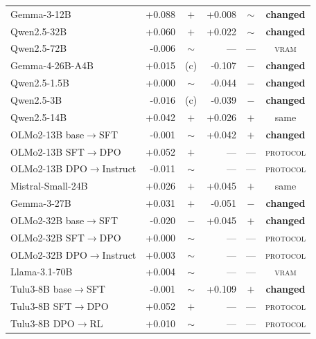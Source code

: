 \begin{table}[t]
\begin{tabular}{lrcrcc}
Gemma-3-12B & +0.088 & $+$ & +0.008 & $\sim$ & \textbf{changed} \\
Qwen2.5-32B & +0.060 & $+$ & +0.022 & $\sim$ & \textbf{changed} \\
Qwen2.5-72B & -0.006 & $\sim$ & --- & --- & \textsc{vram} \\
Gemma-4-26B-A4B & +0.015 & (c) & -0.107 & $-$ & \textbf{changed} \\
Qwen2.5-1.5B & +0.000 & $\sim$ & -0.044 & $-$ & \textbf{changed} \\
Qwen2.5-3B & -0.016 & (c) & -0.039 & $-$ & \textbf{changed} \\
Qwen2.5-14B & +0.042 & $+$ & +0.026 & $+$ & same \\
OLMo2-13B base$\rightarrow$SFT & -0.001 & $\sim$ & +0.042 & $+$ & \textbf{changed} \\
OLMo2-13B SFT$\rightarrow$DPO & +0.052 & $+$ & --- & --- & \textsc{protocol} \\
OLMo2-13B DPO$\rightarrow$Instruct & -0.011 & $\sim$ & --- & --- & \textsc{protocol} \\
Mistral-Small-24B & +0.026 & $+$ & +0.045 & $+$ & same \\
Gemma-3-27B & +0.031 & $+$ & -0.051 & $-$ & \textbf{changed} \\
OLMo2-32B base$\rightarrow$SFT & -0.020 & $-$ & +0.045 & $+$ & \textbf{changed} \\
OLMo2-32B SFT$\rightarrow$DPO & +0.000 & $\sim$ & --- & --- & \textsc{protocol} \\
OLMo2-32B DPO$\rightarrow$Instruct & +0.003 & $\sim$ & --- & --- & \textsc{protocol} \\
Llama-3.1-70B & +0.004 & $\sim$ & --- & --- & \textsc{vram} \\
Tulu3-8B base$\rightarrow$SFT & -0.001 & $\sim$ & +0.109 & $+$ & \textbf{changed} \\
Tulu3-8B SFT$\rightarrow$DPO & +0.052 & $+$ & --- & --- & \textsc{protocol} \\
Tulu3-8B DPO$\rightarrow$RL & +0.010 & $\sim$ & --- & --- & \textsc{protocol} \\
\bottomrule
\end{tabular}
\end{table}
